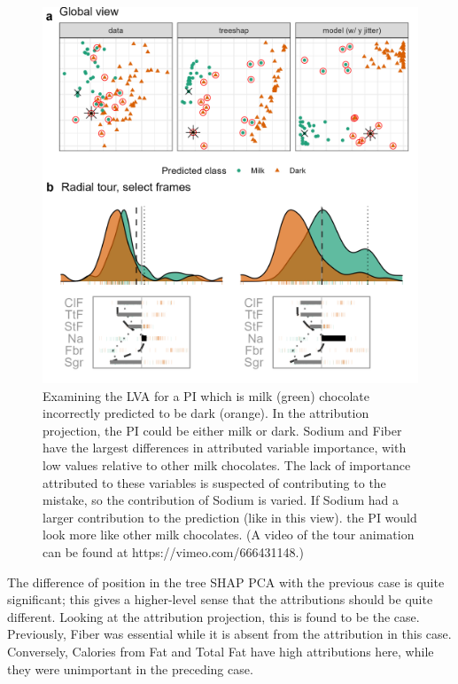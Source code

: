 \documentclass[
]{jss}
\begin{document}
\begin{CodeChunk}
\begin{figure}

{\centering \includegraphics[width=1\linewidth]{./figures/case_chocolates_inverse} 

}

\caption[Examining the LVA for a PI which is milk (green) chocolate incorrectly predicted to be dark (orange)]{Examining the LVA for a PI which is milk (green) chocolate incorrectly predicted to be dark (orange). In the attribution projection, the PI could be either milk or dark. Sodium and Fiber have the largest differences in attributed variable importance, with low values relative to other milk chocolates. The lack of importance attributed to these variables is suspected of contributing to the mistake, so the contribution of Sodium is varied. If Sodium had a larger contribution to the prediction (like in this view). the PI would look more like other milk chocolates. (A video of the tour animation can be found at https://vimeo.com/666431148.)}\label{fig:casechocolatesinverse}
\end{figure}
\end{CodeChunk}

The difference of position in the tree SHAP PCA with the previous case
is quite significant; this gives a higher-level sense that the
attributions should be quite different. Looking at the attribution
projection, this is found to be the case. Previously, Fiber was
essential while it is absent from the attribution in this case.
Conversely, Calories from Fat and Total Fat have high attributions here,
while they were unimportant in the preceding case.
\end{document}
